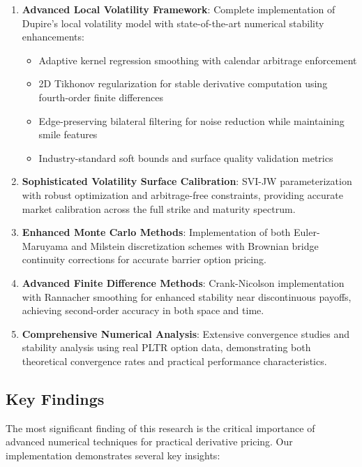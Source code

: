 \documentclass[11pt,a4paper]{article}
\begin{document}
\begin{enumerate}
\item \textbf{Advanced Local Volatility Framework}: Complete implementation of Dupire's local volatility model \cite{Dupire1994} with state-of-the-art numerical stability enhancements:
   \begin{itemize}
   \item Adaptive kernel regression smoothing with calendar arbitrage enforcement
   \item 2D Tikhonov regularization for stable derivative computation using fourth-order finite differences
   \item Edge-preserving bilateral filtering for noise reduction while maintaining smile features
   \item Industry-standard soft bounds and surface quality validation metrics
   \end{itemize}

\item \textbf{Sophisticated Volatility Surface Calibration}: SVI-JW parameterization \cite{Gatheral2014} with robust optimization and arbitrage-free constraints, providing accurate market calibration across the full strike and maturity spectrum.

\item \textbf{Enhanced Monte Carlo Methods}: Implementation of both Euler-Maruyama and Milstein discretization schemes with Brownian bridge continuity corrections \cite{Broadie1997} for accurate barrier option pricing.

\item \textbf{Advanced Finite Difference Methods}: Crank-Nicolson implementation with Rannacher smoothing for enhanced stability near discontinuous payoffs, achieving second-order accuracy in both space and time.

\item \textbf{Comprehensive Numerical Analysis}: Extensive convergence studies and stability analysis using real PLTR option data, demonstrating both theoretical convergence rates and practical performance characteristics.
\end{enumerate}

\subsection{Key Findings}

The most significant finding of this research is the critical importance of advanced numerical techniques for practical derivative pricing. Our implementation demonstrates several key insights:
\end{document}
